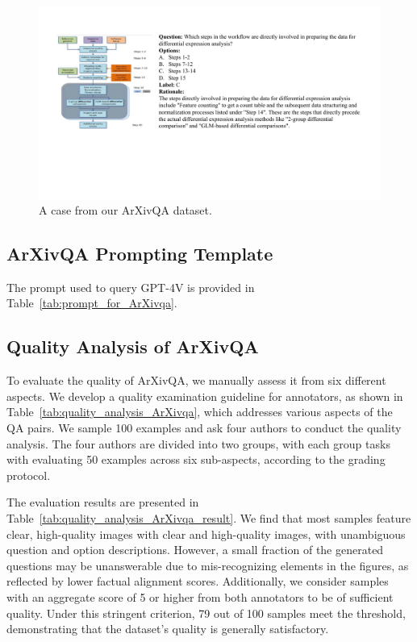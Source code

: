\begin{figure}[tbh!]
    \centering
    \includegraphics[width=0.85\linewidth]{figs/arxivqa_case4.pdf}
    \caption{A case from our ArXivQA dataset.}
    \label{fig:qa_case_4}
\end{figure}




\subsection{ArXivQA Prompting Template}
\label{apx:prompt_template}
The prompt used to query GPT-4V is provided in Table~\ref{tab:prompt_for_ArXivqa}.

\subsection{Quality Analysis of ArXivQA}

To evaluate the quality of ArXivQA, we manually assess it from six different aspects. We develop a quality examination guideline for annotators, as shown in Table~\ref{tab:quality_analysis_ArXivqa}, which addresses various aspects of the QA pairs.
We sample 100 examples and ask four authors to conduct the quality analysis. The four authors are divided into two groups, with each group tasks with evaluating 50 examples across six sub-aspects, according to the grading protocol. 

The evaluation results are presented in Table~\ref{tab:quality_analysis_ArXivqa_result}.
We find that most samples feature clear, high-quality images with clear and high-quality images, with unambiguous question and option descriptions. However, a small fraction of the generated questions may be unanswerable due to mis-recognizing elements in the figures, as reflected by lower factual alignment scores. Additionally, we consider samples with an aggregate score of 5 or higher from both annotators to be of sufficient quality. Under this stringent criterion, 79 out of 100 samples meet the threshold, demonstrating that the dataset's quality is generally satisfactory.

